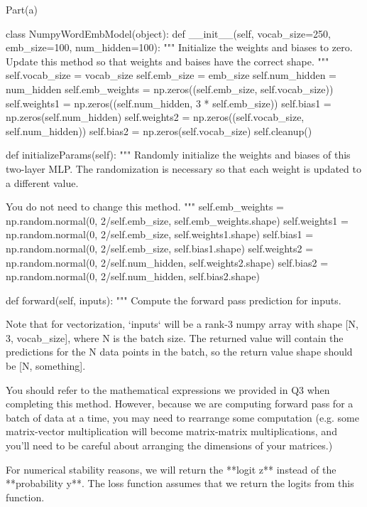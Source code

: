 \documentclass[12pt]{article}
\begin{document}
Part(a)\\
\begin{python}
class NumpyWordEmbModel(object):
    def __init__(self, vocab_size=250, emb_size=100, num_hidden=100):
        """
        Initialize the weights and biases to zero. Update this method
        so that weights and baises have the correct shape.
        """
        self.vocab_size = vocab_size
        self.emb_size = emb_size
        self.num_hidden = num_hidden
        self.emb_weights = np.zeros((self.emb_size, self.vocab_size)) 
        self.weights1 = np.zeros((self.num_hidden, 3 * self.emb_size))  
        self.bias1 = np.zeros(self.num_hidden)            
        self.weights2 = np.zeros((self.vocab_size, self.num_hidden))   
        self.bias2 = np.zeros(self.vocab_size)            
        self.cleanup()

    def initializeParams(self):
        """
        Randomly initialize the weights and biases of this two-layer MLP.
        The randomization is necessary so that each weight is updated to
        a different value.

        You do not need to change this method.
        """
        self.emb_weights = np.random.normal(0, 2/self.emb_size, self.emb_weights.shape)
        self.weights1 = np.random.normal(0, 2/self.emb_size, self.weights1.shape)
        self.bias1 = np.random.normal(0, 2/self.emb_size, self.bias1.shape)
        self.weights2 = np.random.normal(0, 2/self.num_hidden, self.weights2.shape)
        self.bias2 = np.random.normal(0, 2/self.num_hidden, self.bias2.shape)

    def forward(self, inputs):
        """
        Compute the forward pass prediction for inputs.

        Note that for vectorization, `inputs` will be a rank-3 numpy array
        with shape [N, 3, vocab_size], where N is the batch size.
        The returned value will contain the predictions for the N
        data points in the batch, so the return value shape should be
        [N, something].

        You should refer to the mathematical expressions we provided in Q3
        when completing this method. However, because we are computing
        forward pass for a batch of data at a time, you may need to rearrange
        some computation (e.g. some matrix-vector multiplication will become
        matrix-matrix multiplications, and you'll need to be careful about
        arranging the dimensions of your matrices.)

        For numerical stability reasons, we will return the **logit z**
        instead of the **probability y**. The loss function assumes that 
        we return the logits from this function.


\end{python}
\end{document}
